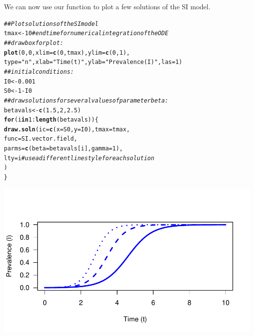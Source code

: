 \documentclass[12pt]{article}\usepackage[]{graphicx}\usepackage[]{color}
\makeatletter
\def\maxwidth{ %
  \ifdim\Gin@nat@width>\linewidth
    \linewidth
  \else
    \Gin@nat@width
  \fi
}
\newcommand{\hlnum}[1]{\textcolor[rgb]{0.686,0.059,0.569}{#1}}%
\newcommand{\hlstr}[1]{\textcolor[rgb]{0.192,0.494,0.8}{#1}}%
\newcommand{\hlcom}[1]{\textcolor[rgb]{0.678,0.584,0.686}{\textit{#1}}}%
\newcommand{\hlopt}[1]{\textcolor[rgb]{0,0,0}{#1}}%
\newcommand{\hlstd}[1]{\textcolor[rgb]{0.345,0.345,0.345}{#1}}%
\newcommand{\hlkwa}[1]{\textcolor[rgb]{0.161,0.373,0.58}{\textbf{#1}}}%
\newcommand{\hlkwb}[1]{\textcolor[rgb]{0.69,0.353,0.396}{#1}}%
\newcommand{\hlkwc}[1]{\textcolor[rgb]{0.333,0.667,0.333}{#1}}%
\newcommand{\hlkwd}[1]{\textcolor[rgb]{0.737,0.353,0.396}{\textbf{#1}}}%
\newenvironment{kframe}{%
 \def\at@end@of@kframe{}%
 \ifinner\ifhmode%
  \def\at@end@of@kframe{\end{minipage}}%
  \begin{minipage}{\columnwidth}%
 \fi\fi%
 \def\FrameCommand##1{\hskip\@totalleftmargin \hskip-\fboxsep
 \colorbox{shadecolor}{##1}\hskip-\fboxsep
     \hskip-\linewidth \hskip-\@totalleftmargin \hskip\columnwidth}%
 \MakeFramed {\advance\hsize-\width
   \@totalleftmargin\z@ \linewidth\hsize
   \@setminipage}}%
 {\par\unskip\endMakeFramed%
 \at@end@of@kframe}
\newenvironment{knitrout}{}{} %
\makeatother
\begin{document}
\begin{enumerate}[(a)]
\begin{itemize}
We can now use our  function to plot a few solutions of the SI model.

\begin{knitrout}
\color{fgcolor}\begin{kframe}
\begin{alltt}
\hlcom{## Plot solutions of the SI model}
\hlstd{tmax} \hlkwb{<-} \hlnum{10} \hlcom{# end time for numerical integration of the ODE}
\hlcom{## draw box for plot:}
\hlkwd{plot}\hlstd{(}\hlnum{0}\hlstd{,}\hlnum{0}\hlstd{,}\hlkwc{xlim}\hlstd{=}\hlkwd{c}\hlstd{(}\hlnum{0}\hlstd{,tmax),}\hlkwc{ylim}\hlstd{=}\hlkwd{c}\hlstd{(}\hlnum{0}\hlstd{,}\hlnum{1}\hlstd{),}
     \hlkwc{type}\hlstd{=}\hlstr{"n"}\hlstd{,}\hlkwc{xlab}\hlstd{=}\hlstr{"Time (t)"}\hlstd{,}\hlkwc{ylab}\hlstd{=}\hlstr{"Prevalence (I)"}\hlstd{,}\hlkwc{las}\hlstd{=}\hlnum{1}\hlstd{)}
\hlcom{## initial conditions:}
\hlstd{I0} \hlkwb{<-} \hlnum{0.001}
\hlstd{S0} \hlkwb{<-} \hlnum{1} \hlopt{-} \hlstd{I0}
\hlcom{## draw solutions for several values of parameter beta:}
\hlstd{betavals} \hlkwb{<-} \hlkwd{c}\hlstd{(}\hlnum{1.5}\hlstd{,}\hlnum{2}\hlstd{,}\hlnum{2.5}\hlstd{)}
\hlkwa{for} \hlstd{(i} \hlkwa{in} \hlnum{1}\hlopt{:}\hlkwd{length}\hlstd{(betavals)) \{}
  \hlkwd{draw.soln}\hlstd{(}\hlkwc{ic}\hlstd{=}\hlkwd{c}\hlstd{(}\hlkwc{x}\hlstd{=S0,}\hlkwc{y}\hlstd{=I0),} \hlkwc{tmax}\hlstd{=tmax,}
            \hlkwc{func}\hlstd{=SI.vector.field,}
            \hlkwc{parms}\hlstd{=}\hlkwd{c}\hlstd{(}\hlkwc{beta}\hlstd{=betavals[i],}\hlkwc{gamma}\hlstd{=}\hlnum{1}\hlstd{),}
            \hlkwc{lty}\hlstd{=i} \hlcom{# use a different line style for each solution}
            \hlstd{)}
\hlstd{\}}
\end{alltt}
\end{kframe}
\includegraphics[width=\maxwidth]{figure/plot_SI_model-1} 


\end{knitrout}
\end{itemize}
\end{enumerate}
\end{document}
